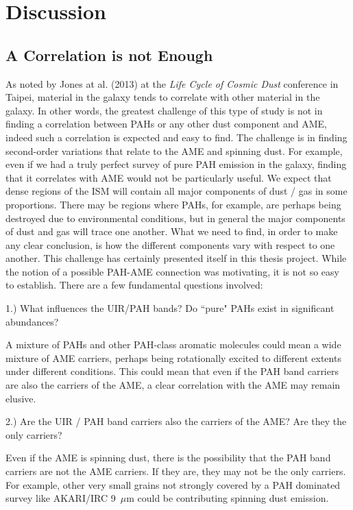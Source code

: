 \chapter{Discussion}
  \label{chap:Discussion}
  \section{A Correlation is not Enough}
     As noted by Jones at al. (2013) at the \textit{Life Cycle of Cosmic Dust} conference in Taipei, material in the galaxy tends to correlate with other material in the galaxy. In other words, the greatest challenge of this type of study is not in finding a correlation between PAHs or any other dust component and  AME, indeed such a correlation is expected and easy to find. The challenge is in finding second-order variations that relate to the AME and spinning dust. For example, even if we had a truly perfect survey of pure PAH emission in the galaxy, finding that it correlates with AME would not be particularly useful. We expect that dense regions of the ISM will contain all major components of dust / gas in some proportions. There may be regions where PAHs, for example, are perhaps being destroyed due to environmental conditions, but in general the major components of dust and gas will trace one another. 
     What we need to find, in order to make any clear conclusion, is how the different components vary with respect to one another. This challenge has certainly presented itself in this thesis project. While the notion of a possible PAH-AME connection was motivating, it is not so easy to establish. There are a few fundamental questions involved:
  
  1.) What influences the UIR/PAH bands? Do ``pure" PAHs exist in significant abundances? 
  
     A mixture of PAHs and other PAH-class aromatic molecules could mean a wide mixture of AME carriers, perhaps being rotationally excited to different extents under different conditions. This could mean that even if the PAH band carriers are also the carriers of the AME, a clear correlation with the AME may remain elusive. 
  
  2.) Are the UIR / PAH band carriers also the carriers of the AME? Are they the only carriers?

    Even if the AME is spinning dust, there is the possibility that the PAH band carriers are not the AME carriers. If they are, they may not be the only carriers. For example, other very small grains not strongly covered by a PAH dominated survey like AKARI/IRC 9~$\mu$m could be contributing spinning dust emission.
  
